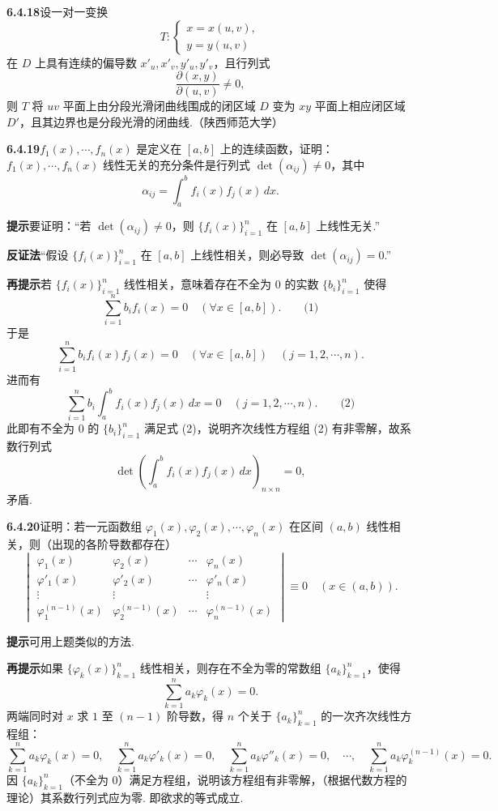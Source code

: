 \documentclass[UTF8,12pt,a4paper,fontset=fandol]{ctexart}
\begin{document}
\noindent\textbf{6.4.18}\quad 设一对一变换
\[
T:
\begin{cases}
  x=x(u,v),\\
  y=y(u,v)
\end{cases}
\]
在 $D$ 上具有连续的偏导数 $x'_u,x'_v,y'_u,y'_v$，且行列式
\[
  \frac{\partial(x,y)}{\partial(u,v)}\ne0,
\]
则 $T$ 将 $uv$ 平面上由分段光滑闭曲线围成的闭区域 $D$ 变为 $xy$ 平面上相应闭区域 $D'$，且其边界也是分段光滑的闭曲线.（陕西师范大学）

\noindent\textbf{6.4.19}\quad $f_1(x),\cdots,f_n(x)$ 是定义在 $[a,b]$ 上的连续函数，证明：$f_1(x),\cdots,f_n(x)$ 线性无关的充分条件是行列式
$\det(\alpha_{ij})\ne0$，其中
\[
  \alpha_{ij}=\int_a^b f_i(x)f_j(x)\,dx.
\]

\noindent\textbf{提示}\quad 要证明：“若 $\det(\alpha_{ij})\ne0$，则 $\{f_i(x)\}_{i=1}^n$ 在 $[a,b]$ 上线性无关.”

\noindent\textbf{反证法}\quad “假设 $\{f_i(x)\}_{i=1}^n$ 在 $[a,b]$ 上线性相关，则必导致 $\det(\alpha_{ij})=0$.”

\noindent\textbf{再提示}\quad 若 $\{f_i(x)\}_{i=1}^n$ 线性相关，意味着存在不全为 $0$ 的实数 $\{b_i\}_{i=1}^n$ 使得
\[
  \sum_{i=1}^n b_i f_i(x)=0\quad(\forall x\in[a,b]). \qquad\text{(1)}
\]
于是
\[
  \sum_{i=1}^n b_i f_i(x)f_j(x)=0\quad(\forall x\in[a,b])\quad(j=1,2,\cdots,n).
\]
进而有
\[
  \sum_{i=1}^n b_i\int_a^b f_i(x)f_j(x)\,dx=0
  \quad(j=1,2,\cdots,n). \qquad\text{(2)}
\]
此即有不全为 $0$ 的 $\{b_i\}_{i=1}^n$ 满足式 (2)，说明齐次线性方程组 (2) 有非零解，故系数行列式
\[
  \det\left(\int_a^b f_i(x)f_j(x)\,dx\right)_{n\times n}=0,
\]
矛盾.

\noindent\textbf{6.4.20}\quad 证明：若一元函数组
$\varphi_1(x),\varphi_2(x),\cdots,\varphi_n(x)$ 在区间 $(a,b)$ 线性相关，则（出现的各阶导数都存在）
\[
\begin{vmatrix}
  \varphi_1(x)&\varphi_2(x)&\cdots&\varphi_n(x)\\
  \varphi'_1(x)&\varphi'_2(x)&\cdots&\varphi'_n(x)\\
  \vdots&\vdots&&\vdots\\
  \varphi_1^{(n-1)}(x)&\varphi_2^{(n-1)}(x)&\cdots&\varphi_n^{(n-1)}(x)
\end{vmatrix}
\equiv0\quad(x\in(a,b)).
\]

\noindent\textbf{提示}\quad 可用上题类似的方法.

\noindent\textbf{再提示}\quad 如果 $\{\varphi_k(x)\}_{k=1}^n$ 线性相关，则存在不全为零的常数组
$\{a_k\}_{k=1}^n$，使得
\[
  \sum_{k=1}^n a_k\varphi_k(x)=0.
\]
两端同时对 $x$ 求 $1$ 至 $(n-1)$ 阶导数，得 $n$ 个关于 $\{a_k\}_{k=1}^n$ 的一次齐次线性方程组：
\[
  \sum_{k=1}^n a_k\varphi_k(x)=0,\quad
  \sum_{k=1}^n a_k\varphi'_k(x)=0,\quad
  \sum_{k=1}^n a_k\varphi''_k(x)=0,\quad\cdots,\quad
  \sum_{k=1}^n a_k\varphi_k^{(n-1)}(x)=0.
\]
因 $\{a_k\}_{k=1}^n$（不全为 $0$）满足方程组，说明该方程组有非零解，（根据代数方程的理论）其系数行列式应为零. 即欲求的等式成立.
\end{document}
